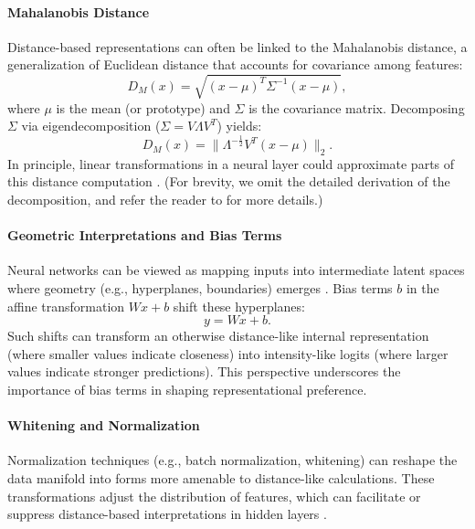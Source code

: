 \paragraph{Mahalanobis Distance}
Distance-based representations can often be linked to the Mahalanobis distance, a generalization of Euclidean distance that accounts for covariance among features:
\begin{equation}
    D_M(x) = \sqrt{(x - \mu)^T \Sigma^{-1} (x - \mu)},
    \label{eq:mahalanobis-1}
\end{equation}
where $\mu$ is the mean (or prototype) and $\Sigma$ is the covariance matrix. 
Decomposing $\Sigma$ via eigendecomposition ($\Sigma = V \Lambda V^T$) yields:
\begin{equation}
    D_M(x) = \|\Lambda^{-\frac{1}{2}} V^T (x - \mu)\|_2.
    \label{eq:mahalanobis-2}
\end{equation}
In principle, linear transformations in a neural layer could approximate parts of this distance computation \cite{bishop2006pattern}. (For brevity, we omit the detailed derivation of the decomposition, and refer the reader to \cite{bishop2006pattern} for more details.)

\paragraph{Geometric Interpretations and Bias Terms}
Neural networks can be viewed as mapping inputs into intermediate latent spaces where geometry (e.g., hyperplanes, boundaries) emerges \cite{jolliffe2002pca}. Bias terms $b$ in the affine transformation $Wx + b$ shift these hyperplanes:
\begin{equation}
    y = Wx + b.
\end{equation}
Such shifts can transform an otherwise distance-like internal representation (where smaller values indicate closeness) into intensity-like logits (where larger values indicate stronger predictions). This perspective underscores the importance of bias terms in shaping representational preference.

\paragraph{Whitening and Normalization}
Normalization techniques (e.g., batch normalization, whitening) can reshape the data manifold into forms more amenable to distance-like calculations. These transformations adjust the distribution of features, which can facilitate or suppress distance-based interpretations in hidden layers \cite{bishop2006pattern}.

